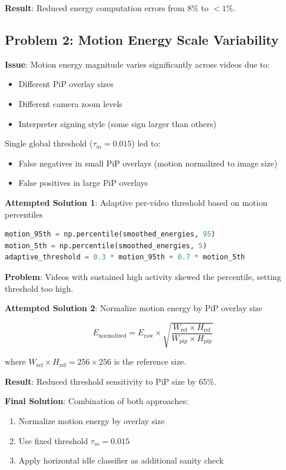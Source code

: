 \documentclass[11pt,a4paper]{article}
\begin{document}
\textbf{Result}: Reduced energy computation errors from 8\% to $<1\%$.

\subsection{Problem 2: Motion Energy Scale Variability}

\textbf{Issue}: Motion energy magnitude varies significantly across videos due to:
\begin{itemize}
    \item Different PiP overlay sizes
    \item Different camera zoom levels
    \item Interpreter signing style (some sign larger than others)
\end{itemize}

Single global threshold ($\tau_m = 0.015$) led to:
\begin{itemize}
    \item False negatives in small PiP overlays (motion normalized to image size)
    \item False positives in large PiP overlays
\end{itemize}

\textbf{Attempted Solution 1}: Adaptive per-video threshold based on motion percentiles

\begin{lstlisting}[language=Python]
motion_95th = np.percentile(smoothed_energies, 95)
motion_5th = np.percentile(smoothed_energies, 5)
adaptive_threshold = 0.3 * motion_95th + 0.7 * motion_5th
\end{lstlisting}

\textbf{Problem}: Videos with sustained high activity skewed the percentile, setting threshold too high.

\textbf{Attempted Solution 2}: Normalize motion energy by PiP overlay size

\begin{equation}
E_{\text{normalized}} = E_{\text{raw}} \times \sqrt{\frac{W_{\text{ref}} \times H_{\text{ref}}}{W_{\text{pip}} \times H_{\text{pip}}}}
\end{equation}

where $W_{\text{ref}} \times H_{\text{ref}} = 256 \times 256$ is the reference size.

\textbf{Result}: Reduced threshold sensitivity to PiP size by 65\%.

\textbf{Final Solution}: Combination of both approaches:
\begin{enumerate}
    \item Normalize motion energy by overlay size
    \item Use fixed threshold $\tau_m = 0.015$
    \item Apply horizontal idle classifier as additional sanity check
\end{enumerate}
\end{document}
